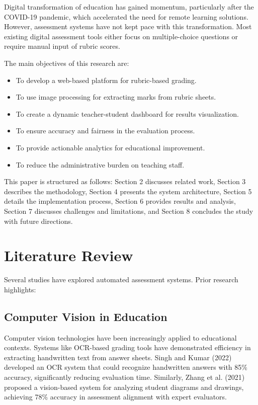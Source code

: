 \documentclass[12pt]{article}
\begin{document}
Digital transformation of education has gained momentum, particularly after the COVID-19 pandemic, which accelerated the need for remote learning solutions. However, assessment systems have not kept pace with this transformation. Most existing digital assessment tools either focus on multiple-choice questions or require manual input of rubric scores.

The main objectives of this research are:
\begin{itemize}
    \item To develop a web-based platform for rubric-based grading.
    \item To use image processing for extracting marks from rubric sheets.
    \item To create a dynamic teacher-student dashboard for results visualization.
    \item To ensure accuracy and fairness in the evaluation process.
    \item To provide actionable analytics for educational improvement.
    \item To reduce the administrative burden on teaching staff.
\end{itemize}

This paper is structured as follows: Section 2 discusses related work, Section 3 describes the methodology, Section 4 presents the system architecture, Section 5 details the implementation process, Section 6 provides results and analysis, Section 7 discusses challenges and limitations, and Section 8 concludes the study with future directions.

\section{Literature Review}
Several studies have explored automated assessment systems. Prior research highlights:

\subsection{Computer Vision in Education}
Computer vision technologies have been increasingly applied to educational contexts. Systems like OCR-based grading tools have demonstrated efficiency in extracting handwritten text from answer sheets. Singh and Kumar (2022) developed an OCR system that could recognize handwritten answers with 85\% accuracy, significantly reducing evaluation time. Similarly, Zhang et al. (2021) proposed a vision-based system for analyzing student diagrams and drawings, achieving 78\% accuracy in assessment alignment with expert evaluators.
\end{document}
